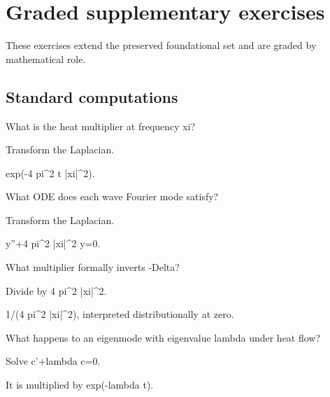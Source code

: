 \section{Graded supplementary exercises}
These exercises extend the preserved foundational set and are graded by mathematical role.

\subsection*{Standard computations}

\begin{exercise}\label{exr:iii28-expand-01}
What is the heat multiplier at frequency xi?
\end{exercise}
\begin{hint}
Transform the Laplacian.
\end{hint}
\begin{solution}
exp(-4 pi\textasciicircum{}2 t |xi|\textasciicircum{}2).
\end{solution}

\begin{exercise}\label{exr:iii28-expand-02}
What ODE does each wave Fourier mode satisfy?
\end{exercise}
\begin{hint}
Transform the Laplacian.
\end{hint}
\begin{solution}
y''+4 pi\textasciicircum{}2 |xi|\textasciicircum{}2 y=0.
\end{solution}

\begin{exercise}\label{exr:iii28-expand-03}
What multiplier formally inverts -Delta?
\end{exercise}
\begin{hint}
Divide by 4 pi\textasciicircum{}2 |xi|\textasciicircum{}2.
\end{hint}
\begin{solution}
1/(4 pi\textasciicircum{}2 |xi|\textasciicircum{}2), interpreted distributionally at zero.
\end{solution}

\begin{exercise}\label{exr:iii28-expand-04}
What happens to an eigenmode with eigenvalue lambda under heat flow?
\end{exercise}
\begin{hint}
Solve c'+lambda c=0.
\end{hint}
\begin{solution}
It is multiplied by exp(-lambda t).
\end{solution}

